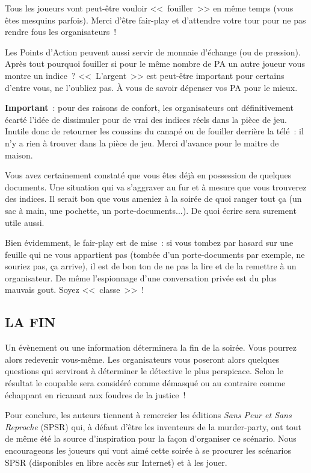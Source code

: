 \documentclass[14pt,twocolumn]{extarticle}
\begin{document}
Tous les joueurs vont peut-être vouloir <<~fouiller~>> en même temps (vous êtes
mesquins parfois). Merci d'être fair-play et d'attendre votre tour pour ne pas
rendre fous les organisateurs~!

Les Points d'Action peuvent aussi servir de monnaie d'échange (ou de pression).
Après tout pourquoi fouiller si pour le même nombre de PA un autre joueur vous
montre un indice~? <<~L'argent~>> est peut-être important pour certains
d'entre vous, ne l'oubliez pas. À vous de savoir dépenser vos PA pour le mieux.

\textbf{Important}~: pour des raisons de confort, les organisateurs ont
définitivement écarté l'idée de dissimuler pour de vrai des indices réels dans
la pièce de jeu. Inutile donc de retourner les coussins du canapé ou de
fouiller derrière la télé~: il n'y a rien à trouver dans la pièce de jeu. Merci
d'avance pour le maitre de maison.

Vous avez certainement constaté que vous êtes déjà en possession de quelques
documents. Une situation qui va s'aggraver au fur et à mesure que vous
trouverez des indices. Il serait bon que vous ameniez à la soirée de quoi
ranger tout ça (un sac à main, une pochette, un porte-documents...). De quoi
écrire sera surement utile aussi.

Bien évidemment, le fair-play est de mise~: si vous tombez par hasard sur une
feuille qui ne vous appartient pas (tombée d'un porte-documents par exemple, ne
souriez pas, ça arrive), il est de bon ton de ne pas la lire et de la remettre
à un organisateur. De même l'espionnage d'une conversation privée est du plus
mauvais gout. Soyez <<~classe~>>~!

\subsection{LA FIN}

Un évènement ou une information déterminera la fin de la soirée. Vous pourrez
alors redevenir vous-même. Les organisateurs vous poseront alors quelques
questions qui serviront à déterminer le détective le plus perspicace. Selon le
résultat le coupable sera considéré comme démasqué ou au contraire comme
échappant en ricanant aux foudres de la justice~!

Pour conclure, les auteurs tiennent à remercier les éditions \textit{Sans Peur
et Sans Reproche} (SPSR) qui, à défaut d'être les inventeurs de la
murder-party, ont tout de même été la source d'inspiration pour la façon
d'organiser ce scénario. Nous encourageons les joueurs qui vont aimé cette
soirée à se procurer les scénarios SPSR (disponibles en libre accès sur
Internet) et à les jouer.
\end{document}
